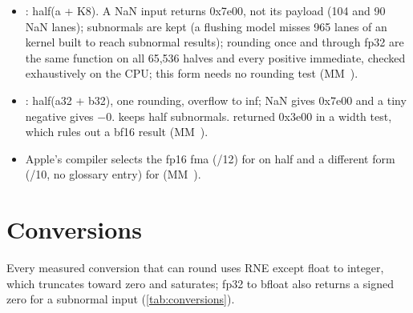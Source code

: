 \begin{itemize}
\item {}: half(a + K8). A NaN input returns 0x7e00, not its payload (104 and 90 NaN lanes);
  subnormals are kept (a flushing model misses 965 lanes of an  kernel built to reach subnormal results);
  rounding once and through fp32 are the same function on all 65,536 halves and every positive immediate, checked
  exhaustively on the CPU; this form needs no rounding test (MM~).
\item {}: half(a32 + b32), one rounding, overflow to inf; NaN gives 0x7e00 and a tiny negative gives −0.
   keeps half subnormals.  returned
  0x3e00 in a width test, which rules out a bf16 result (MM~).
\item Apple's compiler selects the fp16 fma (/12) for  on half and a different form (/10, no glossary entry) for 
  (MM~).
\end{itemize}

\section{Conversions}\label{sec:conversions}

Every measured conversion that can round uses RNE except float to integer, which truncates toward zero and saturates;
fp32 to bfloat also returns a signed zero for a subnormal input (\cref{tab:conversions}).

